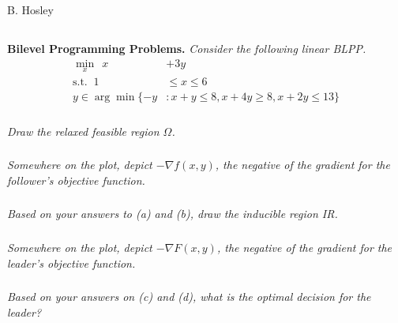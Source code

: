 \documentclass[12pt]{amsart}
\begin{document}
\raggedbottom

\hspace{\fill} {\large B. Hosley}
\bigskip


\setcounter{subsection}{0}
\subsection{}
\textbf{Bilevel Programming Problems.} 
\textit{Consider the following linear BLPP.}
\begin{align*}
	\min_x\	\ x &+ 3y \\
	\text{s.t. }\	1 &\leq x \leq 6 \\
	y \in \arg\min \{ -y &: x + y \leq 8, x + 4y \geq 8, x + 2y \leq 13 \}
\end{align*}

%
%

\subsubsection{}
\textit{Draw the relaxed feasible region $\Omega$.}

\subsubsection{}
\textit{Somewhere on the plot, depict $-\nabla f(x,y)$, the negative of the gradient for the follower’s objective function.}

\subsubsection{}
\textit{Based on your answers to (a) and (b), draw the inducible region IR.}

\subsubsection{}
\textit{Somewhere on the plot, depict $-\nabla F(x,y)$, the negative of the gradient for the leader’s objective function.}

\subsubsection{}
\textit{Based on your answers on (c) and (d), what is the optimal decision for the leader?}
\end{document}
